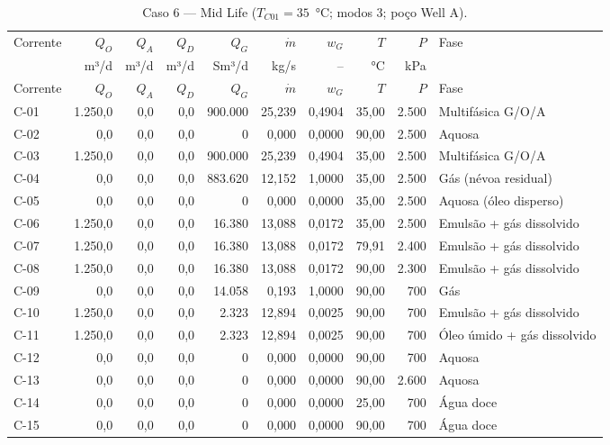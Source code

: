 \documentclass[11pt,a4paper]{article}
\numberwithin{equation}{section}
\numberwithin{table}{section}
\numberwithin{figure}{section}
\begin{document}
{\footnotesize\setlength{\tabcolsep}{3pt}\begin{longtable}{lrrrrrrrrL{2.5cm}}
\caption{Caso 6 --- Mid Life ($T_{C01}=35$~°C; modos 3; poço Well A).}\\\toprule
Corrente & $Q_O$ & $Q_A$ & $Q_D$ & $Q_G$ & $\dot m$ & $w_G$ & $T$ & $P$ & Fase\\ & m³/d & m³/d & m³/d & Sm³/d & kg/s & -- & °C & kPa & \\\midrule\endfirsthead
\toprule Corrente & $Q_O$ & $Q_A$ & $Q_D$ & $Q_G$ & $\dot m$ & $w_G$ & $T$ & $P$ & Fase\\\midrule\endhead
C-01 & 1.250,0 & 0,0 & 0,0 & 900.000 & 25,239 & 0,4904 & 35,00 & 2.500 & {\scriptsize Multifásica G/O/A}\\
C-02 & 0,0 & 0,0 & 0,0 & 0 & 0,000 & 0,0000 & 90,00 & 2.500 & {\scriptsize Aquosa}\\
C-03 & 1.250,0 & 0,0 & 0,0 & 900.000 & 25,239 & 0,4904 & 35,00 & 2.500 & {\scriptsize Multifásica G/O/A}\\
C-04 & 0,0 & 0,0 & 0,0 & 883.620 & 12,152 & 1,0000 & 35,00 & 2.500 & {\scriptsize Gás (névoa residual)}\\
C-05 & 0,0 & 0,0 & 0,0 & 0 & 0,000 & 0,0000 & 35,00 & 2.500 & {\scriptsize Aquosa (óleo disperso)}\\
C-06 & 1.250,0 & 0,0 & 0,0 & 16.380 & 13,088 & 0,0172 & 35,00 & 2.500 & {\scriptsize Emulsão + gás dissolvido}\\
C-07 & 1.250,0 & 0,0 & 0,0 & 16.380 & 13,088 & 0,0172 & 79,91 & 2.400 & {\scriptsize Emulsão + gás dissolvido}\\
C-08 & 1.250,0 & 0,0 & 0,0 & 16.380 & 13,088 & 0,0172 & 90,00 & 2.300 & {\scriptsize Emulsão + gás dissolvido}\\
C-09 & 0,0 & 0,0 & 0,0 & 14.058 & 0,193 & 1,0000 & 90,00 & 700 & {\scriptsize Gás}\\
C-10 & 1.250,0 & 0,0 & 0,0 & 2.323 & 12,894 & 0,0025 & 90,00 & 700 & {\scriptsize Emulsão + gás dissolvido}\\
C-11 & 1.250,0 & 0,0 & 0,0 & 2.323 & 12,894 & 0,0025 & 90,00 & 700 & {\scriptsize Óleo úmido + gás dissolvido}\\
C-12 & 0,0 & 0,0 & 0,0 & 0 & 0,000 & 0,0000 & 90,00 & 700 & {\scriptsize Aquosa}\\
C-13 & 0,0 & 0,0 & 0,0 & 0 & 0,000 & 0,0000 & 90,00 & 2.600 & {\scriptsize Aquosa}\\
C-14 & 0,0 & 0,0 & 0,0 & 0 & 0,000 & 0,0000 & 25,00 & 700 & {\scriptsize Água doce}\\
C-15 & 0,0 & 0,0 & 0,0 & 0 & 0,000 & 0,0000 & 90,00 & 700 & {\scriptsize Água doce}\\

\end{longtable}}
\end{document}
